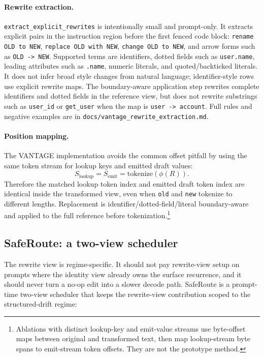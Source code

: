 \documentclass[11pt,a4paper]{article}
\begin{document}
\paragraph{Rewrite extraction.}
\texttt{extract\_explicit\_rewrites} is intentionally small and
prompt-only. It extracts explicit pairs in the instruction region before
the first fenced code block: \texttt{rename OLD to NEW},
\texttt{replace OLD with NEW}, \texttt{change OLD to NEW}, and arrow
forms such as \texttt{OLD -> NEW}. Supported terms are identifiers,
dotted fields such as \texttt{user.name}, leading attributes such as
\texttt{.name}, numeric literals, and quoted/backticked literals. It
does not infer broad style changes from natural language; identifier-style rows use
explicit rewrite maps. The boundary-aware application step rewrites
complete identifiers and dotted fields in the reference view, but does
not rewrite substrings such as \texttt{user\_id} or
\texttt{get\_user} when the map is \texttt{user -> account}. Full rules
and negative examples are in
\texttt{docs/vantage\_rewrite\_extraction.md}.

\paragraph{Position mapping.}
The VANTAGE implementation avoids the common offset pitfall by using the same
token stream for lookup keys and emitted draft values:
\[
S_{\text{lookup}} = S_{\text{emit}} = \mathrm{tokenize}(\phi(R)).
\]
Therefore the matched lookup token index and emitted draft token index are
identical inside the transformed view, even when \texttt{old} and \texttt{new}
tokenize to different lengths. Replacement is identifier/dotted-field/literal
boundary-aware and applied to the full reference before tokenization.\footnote{Ablations
with distinct lookup-key and emit-value streams use byte-offset maps between
original and transformed text, then map lookup-stream byte spans to emit-stream
token offsets. They are not the prototype method.}

\subsection{SafeRoute: a two-view scheduler}

The rewrite view is regime-specific. It should not pay rewrite-view setup
on prompts where the identity view already owns the surface recurrence, and it
should never turn a no-op edit into a slower decode path. SafeRoute is a
prompt-time two-view scheduler that keeps the rewrite-view contribution scoped
to the structured-drift regime:
\end{document}
